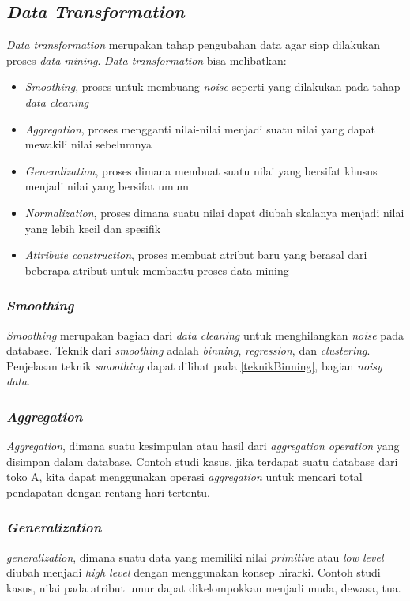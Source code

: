 \subsection{\textsl{Data Transformation}}
\textsl{Data transformation} merupakan tahap pengubahan data agar siap dilakukan proses \textsl{data mining}. \textsl{Data transformation} bisa melibatkan:
	\begin{itemize}
		\item \textsl{Smoothing}, proses untuk membuang \textsl{noise} seperti yang dilakukan pada tahap \textsl{data cleaning}
		\item \textsl{Aggregation}, proses mengganti nilai-nilai menjadi suatu nilai yang dapat mewakili nilai sebelumnya
		\item \textsl{Generalization}, proses dimana membuat suatu nilai yang bersifat khusus menjadi nilai yang bersifat umum
		\item \textsl{Normalization}, proses dimana suatu nilai dapat diubah skalanya menjadi nilai yang lebih kecil dan spesifik
		\item \textsl{Attribute construction}, proses membuat atribut baru yang berasal dari beberapa atribut untuk membantu proses data mining
	\end{itemize}
	
\subsubsection{\textsl{Smoothing}}
\textsl{Smoothing} merupakan bagian dari \textsl{data cleaning} untuk menghilangkan \textsl{noise} pada database. Teknik dari \textsl{smoothing} adalah \textsl{binning}, \textsl{regression}, dan \textsl{clustering}. Penjelasan teknik \textsl{smoothing} dapat dilihat pada \ref{teknikBinning}, bagian \textsl{noisy data}.

\subsubsection{\textsl{Aggregation}}
\textsl{Aggregation}, dimana suatu kesimpulan atau hasil dari \textsl{aggregation operation} yang disimpan dalam database. Contoh studi kasus, jika terdapat suatu database dari toko A, kita dapat menggunakan operasi \textsl{aggregation} untuk mencari total pendapatan dengan rentang hari tertentu.

\subsubsection{\textsl{Generalization}}	
\textsl{generalization}, dimana suatu data yang memiliki nilai \textsl{primitive} atau \textsl{low level} diubah menjadi \textsl{high level} dengan menggunakan konsep hirarki. Contoh studi kasus, nilai pada atribut umur dapat dikelompokkan menjadi muda, dewasa, tua.	
	
